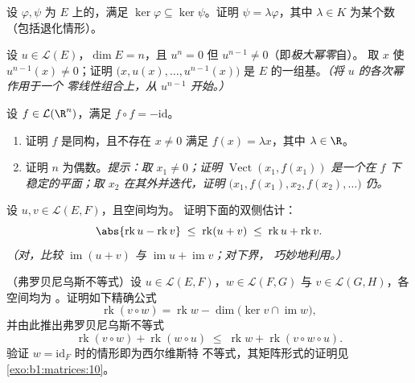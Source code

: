 \begin{exercise}[$\star\star$]\label{exo:b1:linmaps:8}
设 $\varphi, \psi$ 为 $E$ 上的，满足 $\ker\varphi
\subseteq \ker\psi$。证明 $\psi = \lambda\varphi$，其中
$\lambda \in K$ 为某个数（包括退化情形）。
\end{exercise}

\begin{exercise}[$\star\star\star$]\label{exo:b1:linmaps:9}
设 $u \in \mathcal{L}(E)$，$\dim E = n$，且 $u^n = 0$
但 $u^{n-1} \neq 0$（即\emph{极大幂零}自）。
取 $x$ 使 $u^{n-1}(x) \neq 0$；证明 $\bigl(x, u(x), \dots,
u^{n-1}(x)\bigr)$ 是 $E$ 的一组基。\emph{（将 $u$ 的各次幂作用于一个
零线性组合上，从 $u^{n-1}$ 开始。）}
\end{exercise}

\begin{exercise}[$\star\star\star$]\label{exo:b1:linmaps:10}
设 $f \in \mathcal{L}(\R^n)$，满足 $f \circ f = -\mathrm{id}$。
\begin{enumerate}
  \item 证明 $f$ 是同构，且不存在 $x \neq 0$
        满足 $f(x) = \lambda x$，其中 $\lambda \in \R$。
  \item 证明 $n$ 为偶数。\emph{提示：取 $x_1 \neq 0$；证明
        $\operatorname{Vect}(x_1, f(x_1))$ 是一个在
        $f$ 下稳定的平面；取 $x_2$ 在其外并迭代，证明
        $\bigl(x_1, f(x_1), x_2, f(x_2), \dots\bigr)$ 仍。}
\end{enumerate}
\end{exercise}

\begin{exercise}[$\star\star$]\label{exo:b1:linmaps:11}
设 $u, v \in \mathcal{L}(E, F)$，且空间均为。
证明下面的双侧估计：
\[
\abs{\operatorname{rk} u - \operatorname{rk} v}
\;\leq\; \operatorname{rk}(u + v)
\;\leq\; \operatorname{rk} u + \operatorname{rk} v .
\]
\emph{（对，比较 $\operatorname{im}(u+v)$ 与
$\operatorname{im} u + \operatorname{im} v$；对下界，
巧妙地利用。）}
\end{exercise}

\begin{exercise}[$\star\star\star$]\label{exo:b1:linmaps:12}
（弗罗贝尼乌斯不等式）设 $u \in \mathcal{L}(E, F)$，$w \in
\mathcal{L}(F, G)$ 与 $v \in \mathcal{L}(G, H)$，各空间均为
。证明如下精确公式
\[
\operatorname{rk}(v \circ w) = \operatorname{rk} w -
\dim\bigl(\ker v \cap \operatorname{im} w\bigr),
\]
并由此推出弗罗贝尼乌斯不等式
\[
\operatorname{rk}(v \circ w) + \operatorname{rk}(w \circ u)
\;\leq\; \operatorname{rk} w + \operatorname{rk}(v \circ w \circ
u) .
\]
验证 $w = \mathrm{id}_F$ 时的情形即为西尔维斯特
不等式，其矩阵形式的证明见\cref{exo:b1:matrices:10}。
\end{exercise}

